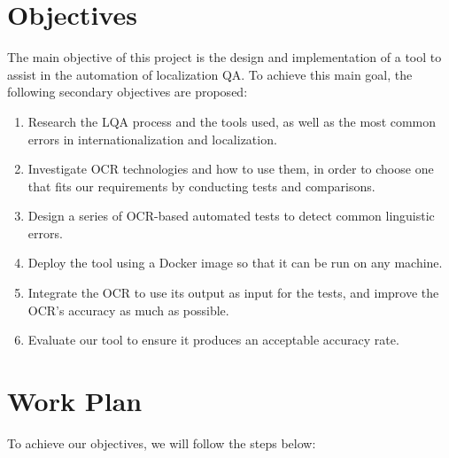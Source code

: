 \section{Objectives}
The main objective of this project is the design and implementation of a tool to assist in the automation of localization QA.  
To achieve this main goal, the following secondary objectives are proposed:

\begin{enumerate}
	\item Research the LQA process and the tools used, as well as the most common errors in internationalization and localization.
	\item Investigate OCR technologies and how to use them, in order to choose one that fits our requirements by conducting tests and comparisons.
	\item Design a series of OCR-based automated tests to detect common linguistic errors.
	\item Deploy the tool using a Docker image so that it can be run on any machine.
	\item Integrate the OCR to use its output as input for the tests, and improve the OCR's accuracy as much as possible.
	\item Evaluate our tool to ensure it produces an acceptable accuracy rate.
\end{enumerate}

\section{Work Plan}
To achieve our objectives, we will follow the steps below:


